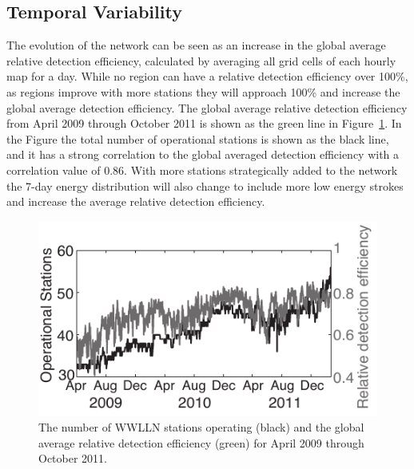 \subsection{Temporal Variability}

The evolution of the network can be seen as an increase in the global average relative detection efficiency, calculated by averaging all grid cells of each hourly map for a day.
While no region can have a relative detection efficiency over 100\%, as regions improve with more stations they will approach 100\% and increase the global average detection efficiency.
The global average relative detection efficiency from April 2009 through October 2011 is shown as the green line in Figure~\ref{efficiency:fig:DE_Evolution}.
In the Figure the total number of operational stations is shown as the black line, and it has a strong correlation to the global averaged detection efficiency with a correlation value of 0.86.
With more stations strategically added to the network the 7-day energy distribution will also change to include more low energy strokes and increase the average relative detection efficiency.


\begin{figure}[ht!]
   \centering
\noindent\includegraphics[scale=1]{efficiency/Figures/2012RS005049-p9.pdf}
   \caption{The number of WWLLN stations operating (black) and the global average relative detection efficiency (green) for April 2009 through October 2011.}
   \label{efficiency:fig:DE_Evolution}
\end{figure}

